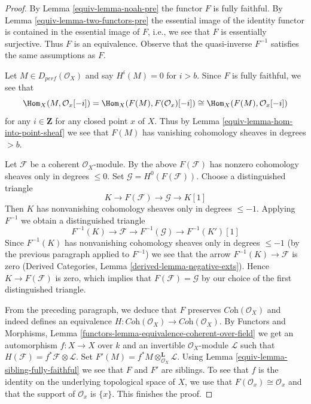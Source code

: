 \begin{proof}

By Lemma \ref{equiv-lemma-noah-pre} the functor $F$ is fully faithful.
By Lemma \ref{equiv-lemma-two-functors-pre} the essential image of
the identity functor is contained in the essential image of $F$, i.e.,
we see that $F$ is essentially surjective. Thus $F$ is an equivalence.
Observe that the quasi-inverse $F^{-1}$ satisfies the same assumptions
as $F$.

\medskip\noindent
Let $M \in D_{perf}(\mathcal{O}_X)$ and say $H^i(M) = 0$ for $i > b$.
Since $F$ is fully faithful, we see that
$$
\Hom_X(M, \mathcal{O}_x[-i]) =
\Hom_X(F(M), F(\mathcal{O}_x)[-i]) \cong
\Hom_X(F(M), \mathcal{O}_x[-i])
$$
for any $i \in \mathbf{Z}$ for any closed point $x$ of $X$.
Thus by Lemma \ref{equiv-lemma-hom-into-point-sheaf} we see that $F(M)$
has vanishing cohomology sheaves in degrees $> b$.

\medskip\noindent
Let $\mathcal{F}$ be a coherent $\mathcal{O}_X$-module. By
the above $F(\mathcal{F})$ has nonzero cohomology sheaves
only in degrees $\leq 0$.
Set $\mathcal{G} = H^0(F(\mathcal{F}))$. Choose a distinguished
triangle
$$
K \to F(\mathcal{F}) \to \mathcal{G} \to K[1]
$$
Then $K$ has nonvanishing cohomology sheaves only in
degrees $\leq -1$.
Applying $F^{-1}$ we obtain a distinguished triangle
$$
F^{-1}(K) \to \mathcal{F} \to F^{-1}(\mathcal{G}) \to F^{-1}(K')[1]
$$
Since $F^{-1}(K)$ has nonvanishing cohomology sheaves only
in degrees $\leq -1$ (by the previous paragraph applied to $F^{-1}$)
we see that the arrow $F^{-1}(K) \to \mathcal{F}$ is zero
(Derived Categories, Lemma \ref{derived-lemma-negative-exts}).
Hence $K \to F(\mathcal{F})$ is zero, which implies
that $F(\mathcal{F}) = \mathcal{G}$ by our choice of the
first distinguished triangle.

\medskip\noindent
From the preceding paragraph, we deduce that $F$ preserves
$\textit{Coh}(\mathcal{O}_X)$ and indeed defines an equivalence
$H : \textit{Coh}(\mathcal{O}_X) \to \textit{Coh}(\mathcal{O}_X)$.
By Functors and Morphisms, Lemma
\ref{functors-lemma-equivalence-coherent-over-field}
we get an automorphism $f : X \to X$ over $k$
and an invertible $\mathcal{O}_X$-module $\mathcal{L}$
such that $H(\mathcal{F}) = f^*\mathcal{F} \otimes \mathcal{L}$.
Set $F'(M) = f^*M \otimes_{\mathcal{O}_X}^\mathbf{L} \mathcal{L}$.
Using Lemma \ref{equiv-lemma-sibling-fully-faithful}
we see that $F$ and $F'$ are siblings.
To see that $f$ is the identity on the underlying topological
space of $X$, we use that $F(\mathcal{O}_x) \cong \mathcal{O}_x$
and that the support of $\mathcal{O}_x$ is $\{x\}$.
This finishes the proof.
\end{proof}

